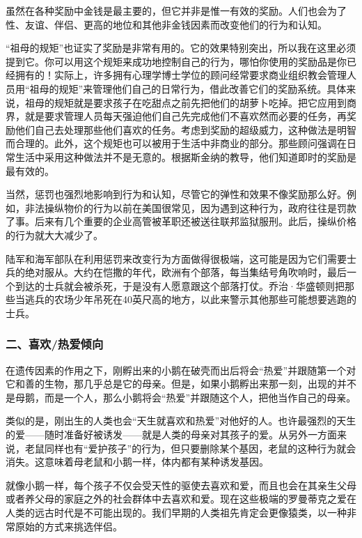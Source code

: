 虽然在各种奖励中金钱是最主要的，但它并非是惟一有效的奖励。人们也会为了性、友谊、伴侣、更高的地位和其他非金钱因素而改变他们的行为和认知。
\par

“祖母的规矩”也证实了奖励是非常有用的。它的效果特别突出，所以我在这里必须提到它。你可以用这个规矩来成功地控制自己的行为，哪怕你使用的奖励品是你已经拥有的！实际上，许多拥有心理学博士学位的顾问经常要求商业组织教会管理人员用“祖母的规矩”来管理他们自己的日常行为，借此改善它们的奖励系统。具体来说，祖母的规矩就是要求孩子在吃甜点之前先把他们的胡萝卜吃掉。把它应用到商界，就是要求管理人员每天强迫他们自己先完成他们不喜欢然而必要的任务，再奖励他们自己去处理那些他们喜欢的任务。考虑到奖励的超级威力，这种做法是明智而合理的。此外，这个规矩也可以被用于生活中非商业的部分。那些顾问强调在日常生活中采用这种做法并不是无意的。根据斯金纳的教导，他们知道即时的奖励是最有效的。
\par

当然，惩罚也强烈地影响到行为和认知，尽管它的弹性和效果不像奖励那么好。例如，非法操纵物价的行为以前在美国很常见，因为遇到这种行为，政府往往是罚款了事。后来有几个重要的企业高管被革职还被送往联邦监狱服刑。此后，操纵价格的行为就大大减少了。
\par

陆军和海军部队在利用惩罚来改变行为方面做得很极端，这可能是因为它们需要士兵的绝对服从。大约在恺撒的年代，欧洲有个部落，每当集结号角吹响时，最后一个到达的士兵就会被杀死，于是没有人愿意跟这个部落打仗。乔治·华盛顿则把那些当逃兵的农场少年吊死在40英尺高的地方，以此来警示其他那些可能想要逃跑的士兵。
\par

\subsubsection*{二、喜欢/热爱倾向}

在遗传因素的作用之下，刚孵出来的小鹅在破壳而出后将会“热爱”并跟随第一个对它和善的生物，那几乎总是它的母亲。但是，如果小鹅孵出来那一刻，出现的并不是母鹅，而是一个人，那么小鹅将会“热爱”并跟随这个人，把他当作自己的母亲。
\par

类似的是，刚出生的人类也会“天生就喜欢和热爱”对他好的人。也许最强烈的天生的爱——随时准备好被诱发——就是人类的母亲对其孩子的爱。从另外一方面来说，老鼠同样也有“爱护孩子”的行为，但只要删除某个基因，老鼠的这种行为就会消失。这意味着母老鼠和小鹅一样，体内都有某种诱发基因。
\par

就像小鹅一样，每个孩子不仅会受天性的驱使去喜欢和爱，而且也会在其亲生父母或者养父母的家庭之外的社会群体中去喜欢和爱。现在这些极端的罗曼蒂克之爱在人类的远古时代是不可能出现的。我们早期的人类祖先肯定会更像猿类，以一种非常原始的方式来挑选伴侣。
\par

